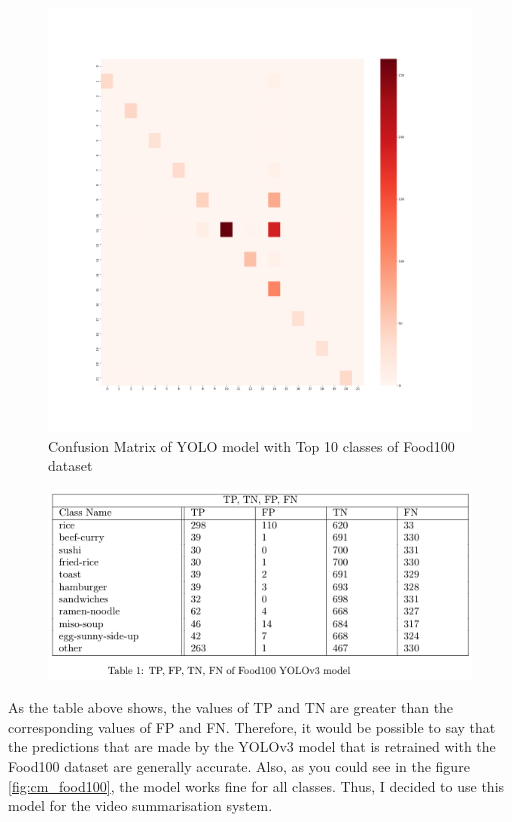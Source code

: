 \documentclass{article}
\begin{document}
\begin{figure}[H]
    \centering
    \includegraphics[scale=0.2]{imgs/confusionMatrix_food_modified.png}
    \caption{Confusion Matrix of YOLO model with Top 10 classes of Food100 dataset}
    \label{fig:cm_food100_top10_classes}
\end{figure}

\begin{figure}[H]
    \centering
    \includegraphics[scale=0.5]{imgs/Food100_table.png}
    \label{fig:food100_table}
\end{figure}

As the table above shows, the values of TP and TN are greater than the corresponding values of FP and FN. Therefore, it would be possible to say that the predictions that are made by the YOLOv3 model that is retrained with the Food100 dataset are generally accurate. Also, as you could see in the figure \ref{fig:cm_food100}, the model works fine for all classes. Thus, I decided to use this model for the video summarisation system.
\end{document}
